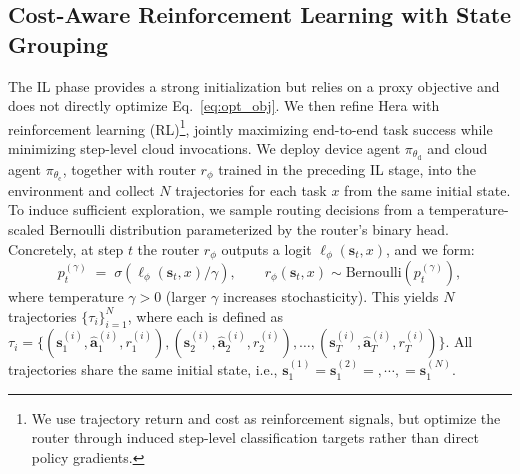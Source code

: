 \documentclass{article}
\newcommand{\name}{Hera\xspace}
\begin{document}
\subsection{Cost-Aware Reinforcement Learning with State Grouping}
\label{sec:hera_rl}
The IL phase provides a strong initialization but relies on a proxy objective and does not directly optimize Eq.~\ref{eq:opt_obj}. We then refine \name with reinforcement learning (RL)\footnote{We use trajectory return and cost as reinforcement signals, but optimize the router through induced step-level classification targets rather than direct policy gradients.}, jointly maximizing end-to-end task success while minimizing step-level cloud invocations.
We deploy device agent $\pi_{\theta_\mathrm{d}}$ and cloud agent $\pi_{\theta_\mathrm{c}}$, together with router $r_\phi$ trained in the preceding IL stage, into the environment and collect $N$ trajectories for each task $x$ from the same initial state.
To induce sufficient exploration, we sample routing decisions from a temperature-scaled Bernoulli distribution parameterized by the router's binary head.
Concretely, at step $t$ the router $r_\phi$ outputs a logit $\ell_\phi(\mathbf{s}_t,x)$, and we form:
\begin{equation}
p_t^{(\gamma)} \;=\; \sigma\!\left(\ell_\phi(\mathbf{s}_t,x)/\gamma\right),
\qquad
r_{\phi}(\mathbf{s}_t,x) \sim \mathrm{Bernoulli}\!\left(p_t^{(\gamma)}\right),
\label{eq:temperature}
\end{equation}
where temperature $\gamma>0$ (larger $\gamma$ increases stochasticity).
This yields $N$ trajectories $\{\tau_i\}_{i=1}^N$, where each is defined as
\(\tau_i = \{(\mathbf{s}_1^{(i)}, \hat{\mathbf{a}}_1^{(i)} ,r_1^{(i)}), (\mathbf{s}_2^{(i)}, \hat{\mathbf{a}}_2^{(i)} ,r_2^{(i)}), \dots, (\mathbf{s}_T^{(i)}, \hat{\mathbf{a}}_T^{(i)} ,r_T^{(i)})\}\). All trajectories share the same initial state, i.e., $\mathbf{s}_1^{(1)}=\mathbf{s}_1^{(2)}=,\cdots,=\mathbf{s}_1^{(N)}$.
\end{document}
